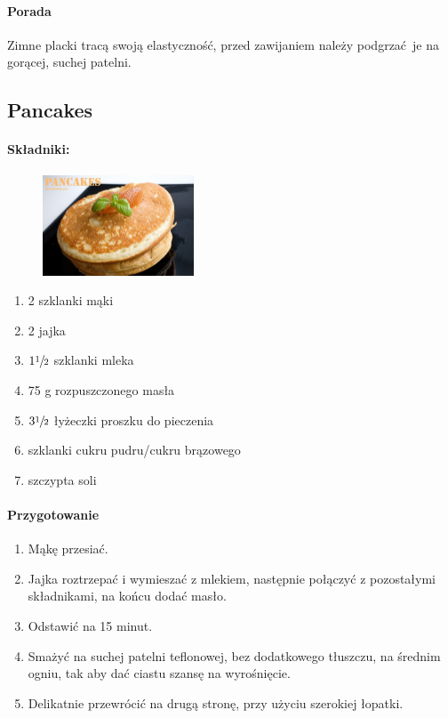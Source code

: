 \documentclass{article}
\begin{document}
    \paragraph{Porada}
    Zimne placki tracą swoją elastyczność, przed zawijaniem należy podgrzać je
    na gorącej, suchej patelni.
    \newpage


    \subsection{Pancakes}
    \bigskip
    \paragraph{Składniki:}
    \begin{figure}
        \includegraphics[width=0.4\textwidth]{pancakes.jpg}
    \end{figure}
    \begin{enumerate}
        \item 2 szklanki mąki
        \item 2 jajka
        \item $1\sfrac{1}{2}$ szklanki mleka
        \item 75 g rozpuszczonego masła
        \item $3\sfrac{1}{2}$ łyżeczki proszku do pieczenia
        \item {} szklanki cukru pudru/cukru brązowego
        \item szczypta soli
    \end{enumerate}

    \paragraph{Przygotowanie}
    \begin{enumerate}
        \item Mąkę przesiać.
        \item Jajka roztrzepać i wymieszać z mlekiem, następnie połączyć z
            pozostałymi składnikami, na końcu dodać masło.
        \item Odstawić na 15 minut.
        \item Smażyć na suchej patelni teflonowej, bez dodatkowego tłuszczu, na
            średnim ogniu, tak aby dać ciastu szansę na wyrośnięcie.
        \item Delikatnie przewrócić na drugą stronę, przy użyciu szerokiej
            łopatki.
    \end{enumerate}
    \newpage
\end{document}
